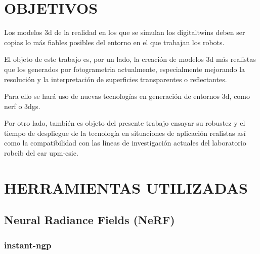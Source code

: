 \documentclass[a4paper, 12pt, spanish, twoside]{article}
\begin{document}
\newpage
\section{OBJETIVOS} \label{sec:objetivos}

Los modelos \acrshort{3d} de la realidad en los que se simulan los \glspl{digitaltwin} deben ser copias lo más fiables posibles del entorno en el que trabajan los robots. 

El objeto de este trabajo es, por un lado, la creación de modelos \acrshort{3d} más realistas que los generados por \gls{fotogrametria} actualmente, especialmente mejorando la resolución y la interpretación de superficies transparentes o reflectantes. 

Para ello se hará uso de nuevas tecnologías en generación de entornos \acrshort{3d}, como \acrfull{nerf} o \acrfull{3dgs}.

Por otro lado, también es objeto del presente trabajo ensayar su robustez y el tiempo de despliegue de la tecnología en situaciones de aplicación realistas así como la compatibilidad con las líneas de investigación actuales del laboratorio \acrshort{robcib} del \acrshort{car} \acrshort{upm}-\acrshort{csic}.

\clearpage





\newpage
\section{HERRAMIENTAS UTILIZADAS} \label{sec:herramientas}

\subsection{Neural Radiance Fields (NeRF)} \label{sec:herramientas:nerf}

\subsubsection{instant-ngp} \label{sec:herramientas:nerf:instant-ngp}
\end{document}
